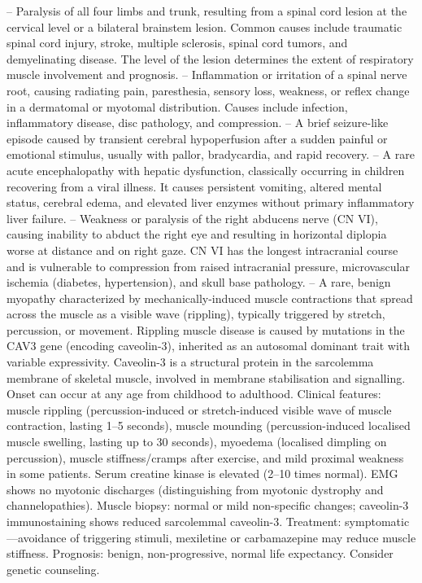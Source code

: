 -- Paralysis of all four limbs and trunk, resulting from a spinal cord lesion at the cervical level or a bilateral brainstem lesion. Common causes include traumatic spinal cord injury, stroke, multiple sclerosis, spinal cord tumors, and demyelinating disease. The level of the lesion determines the extent of respiratory muscle involvement and prognosis.
-- Inflammation or irritation of a spinal nerve root, causing radiating pain, paresthesia, sensory loss, weakness, or reflex change in a dermatomal or myotomal distribution. Causes include infection, inflammatory disease, disc pathology, and compression.
-- A brief seizure-like episode caused by transient cerebral hypoperfusion after a sudden painful or emotional stimulus, usually with pallor, bradycardia, and rapid recovery.
-- A rare acute encephalopathy with hepatic dysfunction, classically occurring in children recovering from a viral illness. It causes persistent vomiting, altered mental status, cerebral edema, and elevated liver enzymes without primary inflammatory liver failure.
-- Weakness or paralysis of the right abducens nerve (CN VI), causing inability to abduct the right eye and resulting in horizontal diplopia worse at distance and on right gaze. CN VI has the longest intracranial course and is vulnerable to compression from raised intracranial pressure, microvascular ischemia (diabetes, hypertension), and skull base pathology.
-- A rare, benign myopathy characterized by mechanically-induced muscle contractions that spread across the muscle as a visible wave (rippling), typically triggered by stretch, percussion, or movement. Rippling muscle disease is caused by mutations in the CAV3 gene (encoding caveolin-3), inherited as an autosomal dominant trait with variable expressivity. Caveolin-3 is a structural protein in the sarcolemma membrane of skeletal muscle, involved in membrane stabilisation and signalling. Onset can occur at any age from childhood to adulthood. Clinical features: muscle rippling (percussion-induced or stretch-induced visible wave of muscle contraction, lasting 1--5 seconds), muscle mounding (percussion-induced localised muscle swelling, lasting up to 30 seconds), myoedema (localised dimpling on percussion), muscle stiffness/cramps after exercise, and mild proximal weakness in some patients. Serum creatine kinase is elevated (2--10 times normal). EMG shows no myotonic discharges (distinguishing from myotonic dystrophy and channelopathies). Muscle biopsy: normal or mild non-specific changes; caveolin-3 immunostaining shows reduced sarcolemmal caveolin-3. Treatment: symptomatic—avoidance of triggering stimuli, mexiletine or carbamazepine may reduce muscle stiffness. Prognosis: benign, non-progressive, normal life expectancy. Consider genetic counseling.
